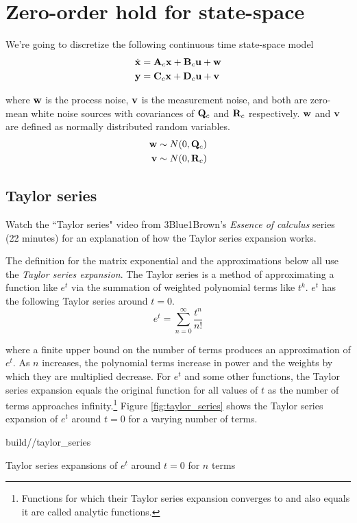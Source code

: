 \section{Zero-order hold for state-space}

We're going to discretize the following continuous time state-space model
\begin{align*}
  \dot{\mathbf{x}} &= \mathbf{A}_c\mathbf{x} + \mathbf{B}_c\mathbf{u} + \mathbf{w} \\
  \mathbf{y} &= \mathbf{C}_c\mathbf{x} + \mathbf{D}_c\mathbf{u} + \mathbf{v}
\end{align*}

where $\mathbf{w}$ is the process noise, $\mathbf{v}$ is the measurement noise, and
both are zero-mean white noise sources with covariances of $\mathbf{Q}_c$ and
$\mathbf{R}_c$ respectively. $\mathbf{w}$ and $\mathbf{v}$ are defined as normally
distributed random variables.
\begin{align*}
  \mathbf{w} &\sim N(0, \mathbf{Q}_c) \\
  \mathbf{v} &\sim N(0, \mathbf{R}_c)
\end{align*}

\subsection{Taylor series}
\begin{remark}
  Watch the ``Taylor series" video from 3Blue1Brown's \textit{Essence of
  calculus} series (22 minutes) \cite{bib:calculus_taylor_series} for an
  explanation of how the Taylor series expansion works.
\end{remark}

The definition for the matrix exponential and the approximations below all use
the \textit{Taylor series expansion}. The Taylor series is a method of
approximating a function like $e^t$ via the summation of weighted polynomial
terms like $t^k$. $e^t$ has the following Taylor series around $t = 0$.
\begin{equation*}
  e^t = \sum_{n = 0}^\infty \frac{t^n}{n!}
\end{equation*}

where a finite upper bound on the number of terms produces an approximation of
$e^t$. As $n$ increases, the polynomial terms increase in power and the weights
by which they are multiplied decrease. For $e^t$ and some other functions, the
Taylor series expansion equals the original function for all values of $t$ as
the number of terms approaches infinity.\footnote{Functions for which their
Taylor series expansion converges to and also equals it are called analytic
functions.} Figure \ref{fig:taylor_series} shows the Taylor series expansion of
$e^t$ around $t = 0$ for a varying number of terms.
\begin{svg}{build/\chapterpath/taylor_series}
  \caption{Taylor series expansions of $e^t$ around $t = 0$ for $n$ terms}
  \label{fig:taylor_series}
\end{svg}

